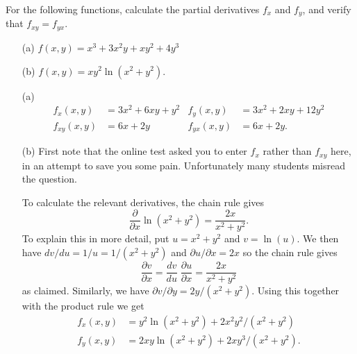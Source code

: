 \documentclass[a4paper]{amsart}
\renewenvironment{solution}{\SolutionInline}{\endSolutionInline}
\begin{document}
\begin{exercise}
 For the following functions, calculate the partial derivatives $f_x$ and $f_y$, 
 and verify that $f_{xy}=f_{yx}$.
 \begin{itemize}
  \item[(a)] $f(x,y)=x^3+3x^2y+xy^2+4y^3$
  \item[(b)] $f(x,y)=xy^2\ln(x^2+y^2)$.
 \end{itemize}
\end{exercise}
\begin{solution}
 \begin{itemize}
  \item[(a)]
   \begin{align*}
    f_x(x,y) &= 3x^{2} + 6xy + y^{2} & f_y(x,y) &= 3x^{2} + 2xy + 12 y^{2} \\
    f_{xy}(x,y) &= 6x+2y & f_{yx}(x,y) &= 6x+2y. 
   \end{align*}
  \item[(b)] 
   First note that the online test asked you to enter $f_x$ rather than
   $f_{xy}$ here, in an attempt to save you some pain.  Unfortunately many
   students misread the question.

   To calculate the relevant derivatives, the chain rule gives 
   \[ \frac{\partial}{\partial x}\ln(x^2+y^2) = \frac{2x}{x^2+y^2}. \]
   To explain this in more detail, put $u=x^2+y^2$ and $v=\ln(u)$.  We then have 
   $dv/du=1/u=1/(x^2+y^2)$ and $\partial u/\partial x=2x$ so the chain rule gives 
   \[ \frac{\partial v}{\partial x} =
       \frac{dv}{du} \; \frac{\partial u}{\partial x} = 
        \frac{2x}{x^2+y^2}
   \]
   as claimed.  Similarly, we have $\partial v/\partial
   y=2y/(x^2+y^2)$.  Using this together with the product rule we get 
   \begin{align*}
    f_x(x,y)    &= y^2\ln(x^2+y^2) + 2x^2y^2/(x^2+y^2) \\
    f_y(x,y)    &= 2xy\ln(x^2+y^2) + 2xy^3/(x^2+y^2).
   \end{align*}


\end{itemize}
\end{solution}
\end{document}
